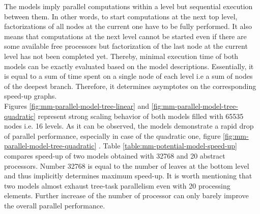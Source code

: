 


The models imply parallel computations within a  level but sequential execution between them. In other words, to start computations at the next top level, factorizations of all nodes at the current  one have to be fully performed. It also means that computations at the next level cannot be started  even if there are some available free processors but factorization of the last node at the current level has not been completed yet. Thereby, minimal execution time  of both models can be exactly evaluated based on the model descriptions. Essentially, it is equal to a sum of time spent on a single node of each level i.e a sum of nodes of the deepest branch. Therefore, it determines asymptotes on the corresponding speed-up graphs.\\



Figures \ref{fig:mm-parallel-model-tree-linear} and \ref{fig:mm-parallel-model-tree-quadratic} represent strong scaling behavior of both models filled with 65535 nodes i.e. 16 levels. As it can be observed, the models demonstrate a rapid drop of parallel performance, especially in case of the quadratic one, figure \ref{fig:mm-parallel-model-tree-quadratic} . Table \ref{table:mm-potential-model-speed-up} compares speed-up of two models obtained with 32768 and 20 abstract processors. Number 32768 is equal to the number of leaves at the bottom level and thus implicitly determines maximum speed-up. It is worth mentioning that two models almost exhaust tree-task parallelism even with 20 processing elements. Further increase of the number of processor can only barely improve the overall parallel performance.\\


